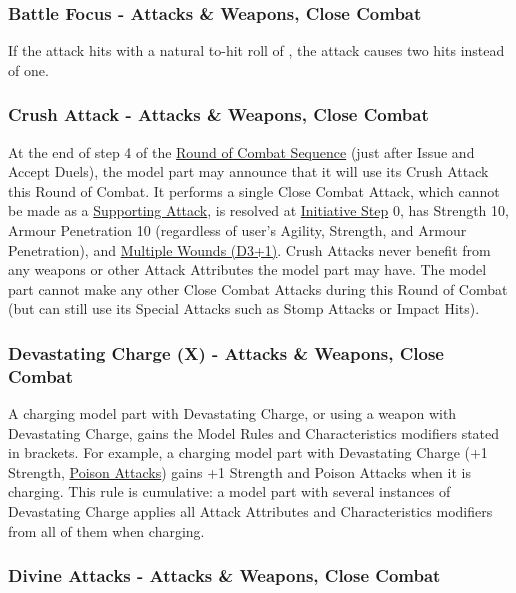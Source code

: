 \subsubsection{Battle Focus - Attacks \&{} Weapons, Close Combat}
\label{battle_focus}

If the attack hits with a natural to-hit roll of , the attack causes two hits instead of one.

\subsubsection{Crush Attack - Attacks \&{} Weapons, Close Combat}
\label{crush_attack}

At the end of step 4 of the \hyperref[round_of_combat_sequence]{Round of Combat Sequence} (just after Issue and Accept Duels), the model part may announce that it will use its Crush Attack this Round of Combat. It performs a single Close Combat Attack, which cannot be made as a \hyperref[supporting_attacks]{Supporting Attack}, is resolved at \hyperref[initiative_order]{Initiative Step} 0, has Strength 10, Armour Penetration 10 (regardless of user's Agility, Strength, and Armour Penetration), and \hyperref[multiple_wounds]{Multiple Wounds (D3+1)}. Crush Attacks never benefit from any weapons or other Attack Attributes the model part may have. The model part cannot make any other Close Combat Attacks during this Round of Combat (but can still use its Special Attacks such as Stomp Attacks or Impact Hits).

\subsubsection{Devastating Charge (X) - Attacks \&{} Weapons, Close Combat}
\label{devastating_charge}

A charging model part with Devastating Charge, or using a weapon with Devastating Charge, gains the Model Rules and Characteristics modifiers stated in brackets. For example, a charging model part with Devastating Charge (+1 Strength, \hyperref[poison_attacks]{Poison Attacks}) gains +1 Strength and Poison Attacks when it is charging. This rule is cumulative: a model part with several instances of Devastating Charge applies all Attack Attributes and Characteristics modifiers from all of them when charging.

\subsubsection{Divine Attacks - Attacks \&{} Weapons, Close Combat}
\label{divine_attacks}

